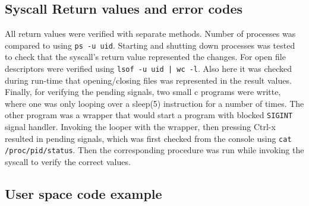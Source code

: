 \documentclass[a4paper,11pt,twoside]{article}
\begin{document}
\subsection{Syscall Return values and error codes}
All return values were verified with separate methods. Number of processes was
compared to using \verb+ps -u uid+. Starting and shutting down processes was
tested to check that the syscall's return value represented the changes. For
open file descriptors were verified using \verb+lsof -u uid | wc -l+. Also here
it was checked during run-time that opening/closing files was represented in the
result values.
Finally, for verifying the pending signals, two small c programs were writte,
where one was only looping over a sleep(5) instruction for a number of times. The
other program was a wrapper that would start a program with blocked \verb+SIGINT+
 signal handler. Invoking the looper with the wrapper, then pressing Ctrl-x
 resulted in pending signals, which was first checked from the console using
 \verb+cat /proc/pid/status+. Then the corresponding procedure was run while invoking
 the syscall to verify the correct values.

\subsection{User space code example}





\end{document}
